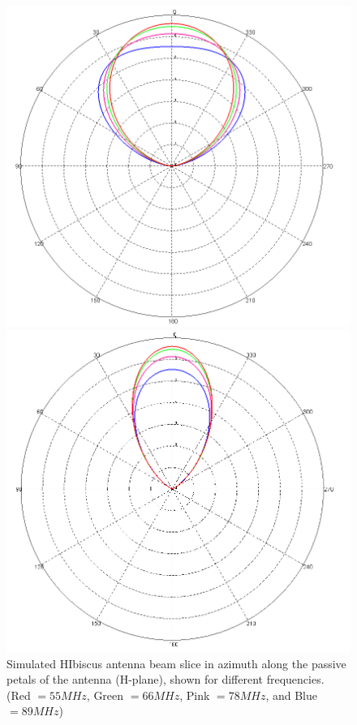 \begin{figure}[htb]
\centering
\begin{minipage}[b]{0.47\textwidth}
\centering
\includegraphics[width=0.95\linewidth]{SCIHI_system/figures/HIbiscus_sim_gain_beam1.png}
\caption{Simulated HIbiscus antenna beam slice in azimuth along the passive petals of the antenna (H-plane), shown for different frequencies. (Red $=55 MHz$, Green $=66 MHz$, Pink $=78 MHz$, and Blue $= 89 MHz$)}
\label{Fig:HIsym_beam}
\end{minipage}%
\begin{minipage}[b]{0.02\textwidth}
\hspace{1cm}
\end{minipage}%
\begin{minipage}[b]{0.47\textwidth}
\centering
\includegraphics[width=0.95\linewidth]{SCIHI_system/figures/HIbiscus_sim_gain_beam2.png}

\end{minipage}
\end{figure}
